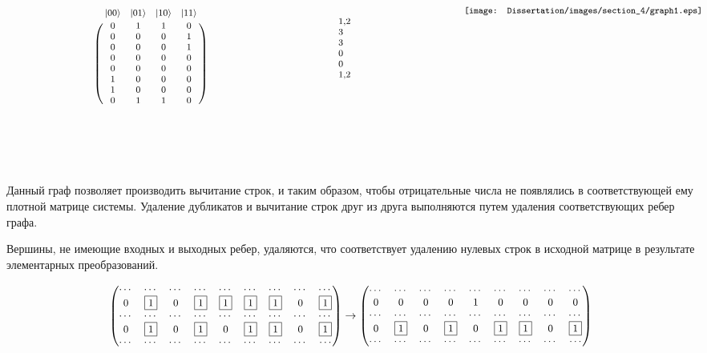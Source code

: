 \[
\hspace{1em}{\footnotesize
\parbox[b][5cm][t]{50mm}{
	\bordermatrix{
		& |00\ra & |01\ra & |10\ra & |11\ra \cr
		& 0 & 1 & 1 & 0 \cr
		& 0 & 0 & 0 & 1 \cr
		& 0 & 0 & 0 & 1 \cr
		& 0 & 0 & 0 & 0 \cr
		& 0 & 0 & 0 & 0 \cr
		& 1 & 0 & 0 & 0 \cr
		& 1 & 0 & 0 & 0 \cr
		& 0 & 1 & 1 & 0 \cr
	}
}
\hfill
\hspace{9.5em}\parbox[b][5cm][t]{35mm}{
	\begin{flushleft}
		1,2\\
		3\\
		3\\
		0\\
		0\\
		1,2
	\end{flushleft}
}
\hfill
\hspace{1.5em}\parbox[b][5cm][t]{50mm}{
	\texttt{[image: Dissertation/images/section\_4/graph1.eps]}
}
}\label{eq:graph}
\]

Данный граф позволяет производить вычитание строк, и таким образом, чтобы отрицательные числа не появлялись в соответствующей ему плотной матрице системы. Удаление дубликатов и вычитание строк друг из друга выполняются путем удаления соответствующих ребер графа. 

Вершины, не имеющие входных и выходных ребер, удаляются, что соответствует удалению нулевых строк в исходной матрице в результате элементарных преобразований.

\[
{\small
\begin{pmatrix}
    \cdots & \cdots & \cdots & \cdots & \cdots & \cdots & \cdots & \cdots & \cdots \cr
    0 & \fbox{1} & 0 & \fbox{1} & \fbox{1} & \fbox{1} & \fbox{1} & 0 & \fbox{1} \cr
    \cdots & \cdots & \cdots & \cdots & \cdots & \cdots & \cdots & \cdots & \cdots \cr
    0 & \fbox{1} & 0 & \fbox{1} & 0 & \fbox{1} & \fbox{1} & 0 & \fbox{1} \cr
    \cdots & \cdots & \cdots & \cdots & \cdots & \cdots & \cdots & \cdots & \cdots
\end{pmatrix}
\rightarrow
\begin{pmatrix}
    \cdots & \cdots & \cdots & \cdots & \cdots & \cdots & \cdots & \cdots & \cdots \cr
    0 & 0 & 0 & 0 & 1 & 0 & 0 & 0 & 0 \cr
    \cdots & \cdots & \cdots & \cdots & \cdots & \cdots & \cdots & \cdots & \cdots \cr
    0 & \fbox{1} & 0 & \fbox{1} & 0 & \fbox{1} & \fbox{1} & 0 & \fbox{1} \cr
    \cdots & \cdots & \cdots & \cdots & \cdots & \cdots & \cdots & \cdots & \cdots
\end{pmatrix}
}
\]

